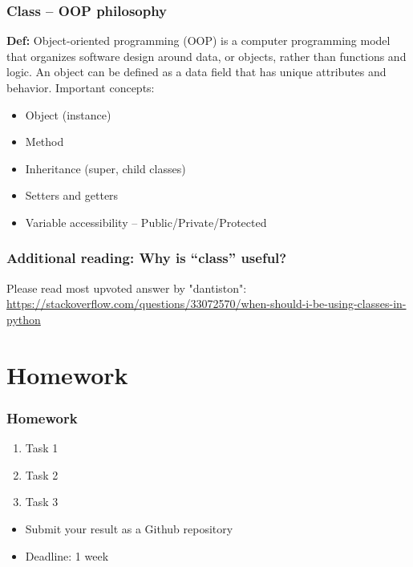 \documentclass{beamer}
\begin{document}
    
    \begin{frame}
    \frametitle{Class – OOP philosophy}
    
    \textbf{Def:} Object-oriented programming (OOP) is a computer programming 
    model that organizes software design around data, or objects, 
    rather than functions and logic. An object can be defined as a 
    data field that has unique attributes and behavior.
    \vskip 2mm 
    Important concepts:
        \begin{itemize}
            \item Object (instance)
            \item Method
            \item Inheritance (super, child classes)
            \item Setters and getters
            \item Variable accessibility – Public/Private/Protected
        \end{itemize}
    \end{frame}

    \begin{frame}
        \frametitle{Additional reading: Why is “class” useful?}
        Please read most upvoted answer by "dantiston":
         \url{https://stackoverflow.com/questions/33072570/when-should-i-be-using-classes-in-python} 
    \end{frame}

    
\section{Homework} 

\begin{frame}
    \frametitle{Homework}
    \begin{enumerate}
        \item Task 1
        \item Task 2
        \item Task 3
    \end{enumerate}

    \vskip 2mm
    \begin{itemize}
        \item Submit your result as a Github repository
        \item Deadline: 1 week %
    \end{itemize}

\end{frame}
\end{document}
